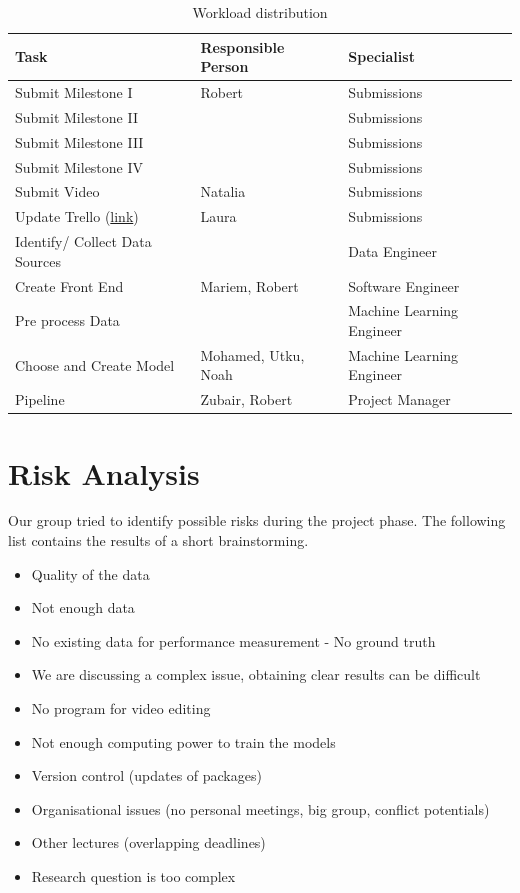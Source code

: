 \documentclass[lang=english,inputenc=utf8,fontsize=10pt]{ldvarticle}
\begin{document}
\begin{table}[ht]
\begin{tabular}{l|l|l}
Task                            & Responsible Person        & Specialist\\ \hline
Submit Milestone I              & Robert                    & Submissions\\
Submit Milestone II             &                           & Submissions\\
Submit Milestone III            &                           & Submissions\\
Submit Milestone IV             &                           & Submissions\\
Submit Video                    & Natalia                   & Submissions\\
Update Trello (\href{https://trello.com/b/2Hq25ghV/ami}{link}) & Laura & Submissions \\
Identify/ Collect Data Sources  &                           & Data Engineer\\
Create Front End                & Mariem, Robert            & Software Engineer\\
Pre process Data                 &                           & Machine Learning Engineer\\
Choose and Create Model          & Mohamed, Utku, Noah       & Machine Learning Engineer\\
Pipeline                        & Zubair, Robert            & Project Manager\\
\end{tabular}
\caption{Workload distribution}
\end{table}

\newpage

\section{Risk Analysis}
Our group tried to identify possible risks during the project phase. The following list contains the results of a short brainstorming.\\

\begin{itemize}
    \item Quality of the data
    \item Not enough data
    \item No existing data for performance measurement - No ground truth
    \item We are discussing a complex issue, obtaining clear results can be difficult
    \item No program for video editing
    \item Not enough computing power to train the models
    \item Version control (updates of packages)
    \item Organisational issues (no personal meetings, big group, conflict potentials)
    \item Other lectures (overlapping deadlines)
    \item Research question is too complex
\end{itemize}
\end{document}
